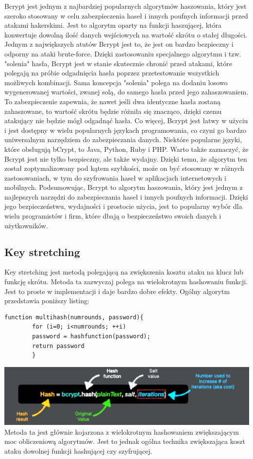 \documentclass[12pt, a4paper]{article}
\begin{document}
Bcrypt jest jednym z najbardziej popularnych algorytmów haszowania, który jest szeroko stosowany w celu zabezpieczenia haseł i innych poufnych informacji przed atakami hakerskimi. Jest to algorytm oparty na funkcji haszującej, która konwertuje dowolną ilość danych wejściowych na wartość skrótu o stałej długości.
Jednym z największych atutów Bcrypt jest to, że jest on bardzo bezpieczny i odporny na ataki brute-force. Dzięki zastosowaniu specjalnego algorytmu i tzw. "solenia" hasła, Bcrypt jest w stanie skutecznie chronić przed atakami, które polegają na próbie odgadnięcia hasła poprzez przetestowanie wszystkich możliwych kombinacji.
Sama koncepcja "solenia" polega na dodaniu losowo wygenerowanej wartości, zwanej solą, do samego hasła przed jego zahaszowaniem. To zabezpieczenie zapewnia, że nawet jeśli dwa identyczne hasła zostaną zahaszowane, to wartość skrótu będzie różniła się znacząco, dzięki czemu atakujący nie będzie mógł odgadnąć hasła.
Co więcej, Bcrypt jest łatwy w użyciu i jest dostępny w wielu popularnych językach programowania, co czyni go bardzo uniwersalnym narzędziem do zabezpieczania danych. Niektóre popularne języki, które obsługują bCrypt, to Java, Python, Ruby i PHP.
Warto także zaznaczyć, że Bcrypt jest nie tylko bezpieczny, ale także wydajny. Dzięki temu, że algorytm ten został zoptymalizowany pod kątem szybkości, może on być stosowany w różnych zastosowaniach, w tym do szyfrowania haseł w aplikacjach internetowych i mobilnych.
Podsumowując, Bcrypt to algorytm haszowania, który jest jednym z najlepszych narzędzi do zabezpieczania haseł i innych poufnych informacji. Dzięki jego bezpieczeństwu, wydajności i prostocie użycia, jest to popularny wybór dla wielu programistów i firm, które dbają o bezpieczeństwo swoich danych i użytkowników.

\subsection{Key stretching}
Key stretching jest metodą polegającą na zwiększenia kosztu ataku na klucz lub funkcję skrótu.
Metoda ta zazwyczaj polega na wielokrotnym hashowaniu funkcji. Jest to proste w implementacji i daje bardzo dobre efekty. 
Ogólny algorytm przedstawia poniższy listing:

\begin{verbatim}
function multihash(numrounds, password){
        for (i=0; i<numrounds; ++i)
        password = hashfunction(password);
        return password
        }

\end{verbatim}
\includegraphics{bcrypt1.JPG}
Metoda ta jest głównie kojarzona z wielokrotnym hashowaniem zwiększającym moc obliczeniową algorytmów. Jest to jednak ogólna technika zwiększająca koszt ataku dowolnej funkcji hashującej czy szyfrującej.
\end{document}
